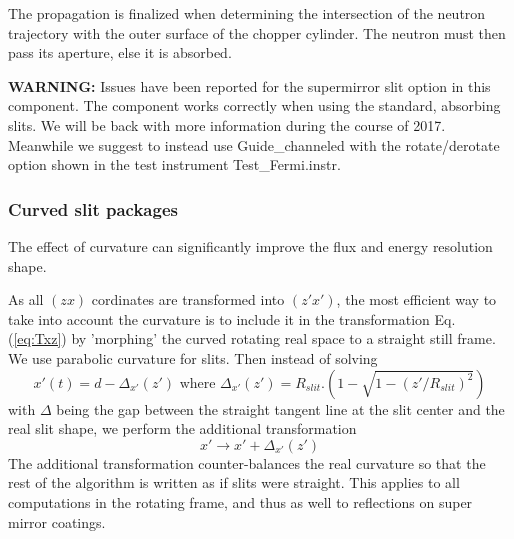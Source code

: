 The propagation is finalized when determining the intersection of the neutron trajectory with the outer surface of the chopper cylinder. The neutron must then pass its aperture, else it is absorbed.

\textbf{WARNING:} Issues have been reported for the supermirror slit option in this component. The component works correctly when using the standard, absorbing slits. We will be back with more information during the course of 2017. Meanwhile we suggest to instead use Guide\_channeled with the rotate/derotate option shown in the test instrument Test\_Fermi.instr. 

\subsubsection{Curved slit packages}

The effect of curvature can significantly improve the flux and energy resolution shape.

As all $(zx)$ cordinates are transformed into $(z'x')$, the most efficient way to take into account the curvature is to include it in the transformation Eq. (\ref{eq:Txz}) by 'morphing' the curved rotating real space to a straight still frame. We use parabolic curvature for slits. Then instead of solving
\begin{equation}x'(t) = d - \Delta_{x'}(z') \textrm{\ where\ } \Delta_{x'}(z')=R_{slit}.(1-\sqrt{1-(z'/R_{slit})^2})
\end{equation}
with $\Delta$ being the gap between the straight tangent line at the slit center and the real slit shape, we perform the additional transformation
\begin{equation}
x' \rightarrow x' + \Delta_{x'}(z')
\end{equation}
The additional transformation counter-balances the real curvature so that the rest of the algorithm is written as if slits were straight.
This applies to all computations in the rotating frame, and thus as well to reflections on super mirror coatings.

